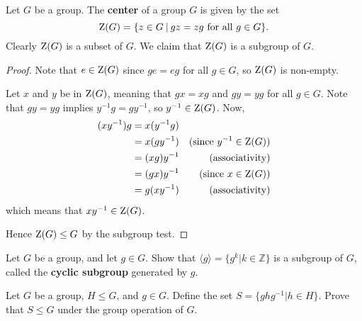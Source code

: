 \begin{example}\label{example-center-of-group}
    Let $G$ be a group. The \textbf{center} of a group $G$ is given by the set
    \[
        \Z{G} = \{z \in G \vert gz = zg \text{ for all } g \in G\}.
    \]
    Clearly $\mathrm{Z}(G)$ is a subset of $G$. We claim that $\mathrm{Z}(G)$ is a subgroup of $G$.

    \begin{proof}
	    Note that $e \in \mathrm{Z}(G)$ since $ge = eg$ for all $g \in G$, so $\mathrm{Z}(G)$ is non-empty.

	    Let $x$ and $y$ be in $\mathrm{Z}(G)$, meaning that $gx = xg$ and $gy = yg$ for all $g \in G$. Note that $gy = yg$ implies $y^{-1}g = gy^{-1}$, so $y^{-1} \in \mathrm{Z}(G)$. Now,
	    \begin{align*}
	        (xy^{-1})g &= x(y^{-1}g)\\
	        &= x(gy^{-1}) & (\text{since } y^{-1} \in \mathrm{Z}(G))\\
	        &= (xg)y^{-1} & (\text{associativity})\\
	        &= (gx)y^{-1} & (\text{since } x \in \mathrm{Z}(G))\\
	        &= g(xy^{-1}) & (\text{associativity})
	    \end{align*}
	    which means that $xy^{-1} \in \mathrm{Z}(G)$.
        
        Hence $\mathrm{Z}(G) \leq G$ by the subgroup test.
    \end{proof}
\end{example}

\begin{exercise}
    Let $G$ be a group, and let $g \in G$. Show that $\langle g \rangle = \{g^k \vert k \in \mathbb{Z}\}$ is a subgroup of $G$, called the \textbf{cyclic subgroup} generated by $g$.
\end{exercise}

\begin{exercise}\label{exercise-conjugate-subgroup}
    Let $G$ be a group, $H \leq G$, and $g \in G$. Define the set $S = \{ghg^{-1} \vert h \in H\}$. Prove that $S \leq G$ under the group operation of $G$.
\end{exercise}

